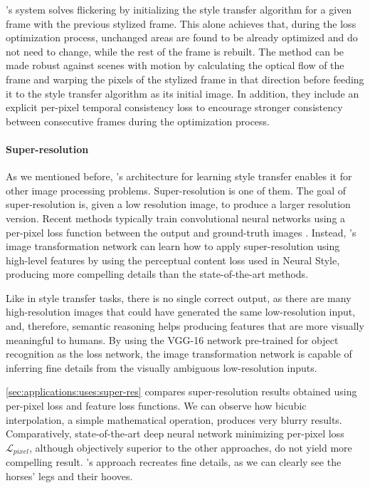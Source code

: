 \citeauthor{Ruder2016}'s system solves flickering by initializing the style transfer algorithm for a given frame with the previous stylized frame.
This alone achieves that, during the loss optimization process, unchanged areas are found to be already optimized and do not need to change, while the rest of the frame is rebuilt.
The method can be made robust against scenes with motion by calculating the optical flow of the frame and warping the pixels of the stylized frame in that direction before feeding it to the style transfer algorithm as its initial image.
In addition, they include an explicit per-pixel temporal consistency loss to encourage stronger consistency between consecutive frames during the optimization process.

\paragraph{Super-resolution}
As we mentioned before, \citeauthor{Johnson2016}'s architecture for learning style transfer enables it for other image processing problems.
Super-resolution is one of them.
The goal of super-resolution is, given a low resolution image, to produce a larger resolution version.
Recent methods typically train convolutional neural networks using a per-pixel loss function between the output and ground-truth images \cite{Dong2016}.
Instead, \citeauthor{Johnson2016}'s image transformation network can learn how to apply super-resolution using high-level features by using the perceptual content loss used in Neural Style, producing more compelling details than the state-of-the-art methods.

Like in style transfer tasks, there is no single correct output, as there are many high-resolution images that could have generated the same low-resolution input, and, therefore, semantic reasoning helps producing features that are more visually meaningful to humans.
By using the VGG-16 network pre-trained for object recognition as the loss network, the image transformation network is capable of inferring fine details from the visually ambiguous low-resolution inputs.

\autoref{sec:applications:uses:super-res} compares super-resolution results obtained using per-pixel loss and feature loss functions.
We can observe how bicubic interpolation, a simple mathematical operation, produces very blurry results.
Comparatively, state-of-the-art deep neural network minimizing per-pixel loss $\mathcal{L}_{pixel}$, although objectively superior to the other approaches, do not yield more compelling result.
\citeauthor{Johnson2016}'s approach recreates fine details, as we can clearly see the horses' legs and their hooves.

